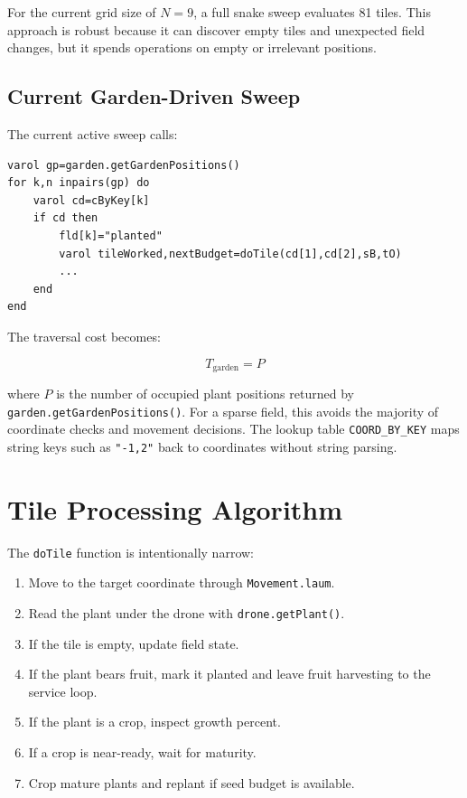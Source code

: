 \documentclass[11pt]{article}
\begin{document}
For the current grid size of \(N=9\), a full snake sweep evaluates 81 tiles.
This approach is robust because it can discover empty tiles and unexpected
field changes, but it spends operations on empty or irrelevant positions.

\subsection{Current Garden-Driven Sweep}

The current active sweep calls:

\begin{verbatim}
varol gp=garden.getGardenPositions()
for k,n inpairs(gp) do
    varol cd=cByKey[k]
    if cd then
        fld[k]="planted"
        varol tileWorked,nextBudget=doTile(cd[1],cd[2],sB,tO)
        ...
    end
end
\end{verbatim}

The traversal cost becomes:

\[
T_{\text{garden}} = P
\]

where \(P\) is the number of occupied plant positions returned by
\texttt{garden.getGardenPositions()}. For a sparse field, this avoids the
majority of coordinate checks and movement decisions. The lookup table
\texttt{COORD\_BY\_KEY} maps string keys such as \texttt{"-1,2"} back to
coordinates without string parsing.

\section{Tile Processing Algorithm}

The \texttt{doTile} function is intentionally narrow:

\begin{enumerate}
    \item Move to the target coordinate through \texttt{Movement.laum}.
    \item Read the plant under the drone with \texttt{drone.getPlant()}.
    \item If the tile is empty, update field state.
    \item If the plant bears fruit, mark it planted and leave fruit harvesting to the service loop.
    \item If the plant is a crop, inspect growth percent.
    \item If a crop is near-ready, wait for maturity.
    \item Crop mature plants and replant if seed budget is available.
\end{enumerate}
\end{document}
